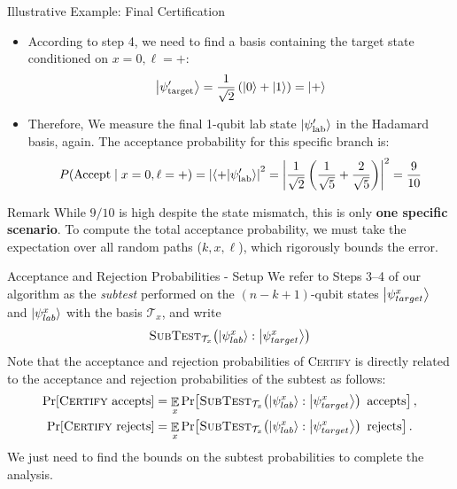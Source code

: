 \begin{frame}{Illustrative Example: Final Certification}
    \begin{itemize}
        \item According to step 4, we need to find a basis containing the target state conditioned on $x=0, \ell=+$:
        \[
            \ket{\psi_{\text{target}}'} = \frac{1}{\sqrt{2}}\left(\ket{0} + \ket{1}\right) = \ket{+}
        \]
        \item Therefore, We measure the final 1-qubit lab state $\ket{\psi_{\text{lab}}'}$ in the Hadamard basis, again. The acceptance probability for this specific branch is:
        \[
            P(\text{Accept} \mid x=0, \ell=+) = \left| \braket{+}{\psi_{\text{lab}}'} \right|^2 = \left| \frac{1}{\sqrt{2}}\left(\frac{1}{\sqrt{5}} + \frac{2}{\sqrt{5}}\right) \right|^2 = \frac{9}{10}
        \]
        \end{itemize}
    \begin{block}{Remark}
        While $9/10$ is high despite the state mismatch, this is only \textbf{one specific scenario}. To compute the total acceptance probability, we must take the expectation over all random paths ($k, x, \ell$), which rigorously bounds the error.
    \end{block}
\end{frame}

\begin{frame}{Acceptance and Rejection Probabilities - Setup}
    We refer to Steps 3--4 of our algorithm as the \emph{subtest} 
    performed on the $(n-k+1)$-qubit states $\ket{\psi_{target}^x}$ and 
    $\ket{\psi_{lab}^x}$ with the basis $\mathcal{T}_x$, and write
    \[
    \textsc{SubTest}_{\mathcal{T}_x}\!\left(\ket{\psi_{lab}^x}:\ket{\psi_{target}^x}\right)
    \]
    Note that the acceptance and rejection probabilities of \textsc{Certify} is
    directly related to the acceptance and rejection probabilities of the subtest as follows:
    \begin{align*}
        \Pr[\textsc{Certify}\text{ accepts}] &= \mathop{\mathbb{E}}_{x}\Pr\!\left[\textsc{SubTest}_{\mathcal{T}_x}\!\left(\ket{\psi_{lab}^x}:\ket{\psi_{target}^x}\right)\text{ accepts}\right],\\
        \Pr[\textsc{Certify}\text{ rejects}] &= \mathop{\mathbb{E}}_{x}\Pr\!\left[\textsc{SubTest}_{\mathcal{T}_x}\!\left(\ket{\psi_{lab}^x}:\ket{\psi_{target}^x}\right)\text{ rejects}\right].
    \end{align*}
    We just need to find the bounds on the subtest probabilities to complete the analysis.
\end{frame}

